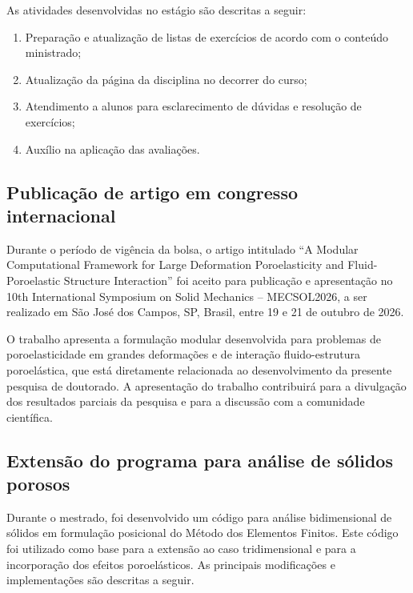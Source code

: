 As atividades desenvolvidas no estágio são descritas a seguir:

\begin{enumerate}
    \item Preparação e atualização de listas de exercícios de acordo com o conteúdo ministrado;
    \item Atualização da página da disciplina no decorrer do curso;
    \item Atendimento a alunos para esclarecimento de dúvidas e resolução de exercícios;
    \item Auxílio na aplicação das avaliações.
\end{enumerate}

\subsection{Publicação de artigo em congresso internacional}

Durante o período de vigência da bolsa, o artigo intitulado ``A Modular Computational Framework for Large Deformation Poroelasticity and Fluid-Poroelastic Structure Interaction'' foi aceito para publicação e apresentação no 10th International Symposium on Solid Mechanics -- MECSOL2026, a ser realizado em São José dos Campos, SP, Brasil, entre 19 e 21 de outubro de 2026.

O trabalho apresenta a formulação modular desenvolvida para problemas de poroelasticidade em grandes deformações e de interação fluido-estrutura poroelástica, que está diretamente relacionada ao desenvolvimento da presente pesquisa de doutorado. A apresentação do trabalho contribuirá para a divulgação dos resultados parciais da pesquisa e para a discussão com a comunidade científica.

\subsection{Extensão do programa para análise de sólidos porosos}

Durante o mestrado, foi desenvolvido um código para análise bidimensional de sólidos em formulação posicional do Método dos Elementos Finitos. Este código foi utilizado como base para a extensão ao caso tridimensional e para a incorporação dos efeitos poroelásticos. As principais modificações e implementações são descritas a seguir.

